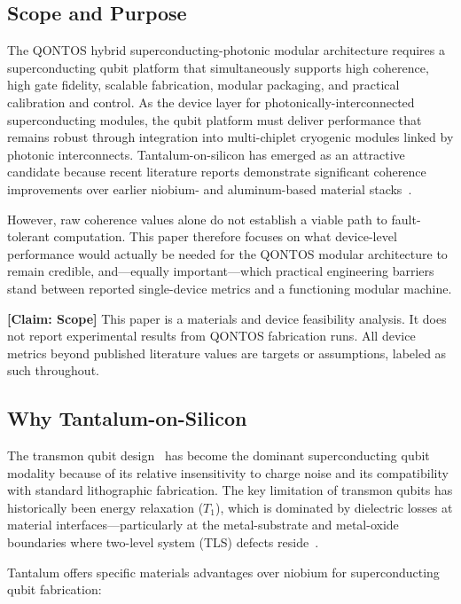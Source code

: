 \documentclass[conference]{IEEEtran}
\begin{document}
\subsection{Scope and Purpose}

The QONTOS hybrid superconducting-photonic modular architecture requires a superconducting qubit platform that simultaneously supports high coherence, high gate fidelity, scalable fabrication, modular packaging, and practical calibration and control. As the device layer for photonically-interconnected superconducting modules, the qubit platform must deliver performance that remains robust through integration into multi-chiplet cryogenic modules linked by photonic interconnects. Tantalum-on-silicon has emerged as an attractive candidate because recent literature reports demonstrate significant coherence improvements over earlier niobium- and aluminum-based material stacks~\cite{place2021, wang2022, bland2025}.

However, raw coherence values alone do not establish a viable path to fault-tolerant computation. This paper therefore focuses on what device-level performance would actually be needed for the QONTOS modular architecture to remain credible, and---equally important---which practical engineering barriers stand between reported single-device metrics and a functioning modular machine.

\textbf{[Claim: Scope]} This paper is a materials and device feasibility analysis. It does not report experimental results from QONTOS fabrication runs. All device metrics beyond published literature values are targets or assumptions, labeled as such throughout.

\subsection{Why Tantalum-on-Silicon}

The transmon qubit design~\cite{koch2007} has become the dominant superconducting qubit modality because of its relative insensitivity to charge noise and its compatibility with standard lithographic fabrication. The key limitation of transmon qubits has historically been energy relaxation ($T_1$), which is dominated by dielectric losses at material interfaces---particularly at the metal-substrate and metal-oxide boundaries where two-level system (TLS) defects reside~\cite{mueller2019}.

Tantalum offers specific materials advantages over niobium for superconducting qubit fabrication:
\end{document}
